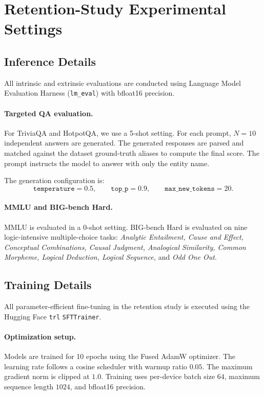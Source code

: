 \documentclass{article}
\begin{document}
\section{Retention-Study Experimental Settings}
\label{app:retention_study_settings}

\subsection{Inference Details}
\label{app:retention_inference_details}

All intrinsic and extrinsic evaluations are conducted using Language Model
Evaluation Harness (\texttt{lm\_eval}) with bfloat16 precision.

\paragraph{Targeted QA evaluation.}
For TriviaQA and HotpotQA, we use a 5-shot setting. For each prompt, \(N=10\)
independent answers are generated. The generated responses are parsed and
matched against the dataset ground-truth aliases to compute the final score.
The prompt instructs the model to answer with only the entity name.

The generation configuration is:
\[
\texttt{temperature}=0.5,
\qquad
\texttt{top\_p}=0.9,
\qquad
\texttt{max\_new\_tokens}=20.
\]

\paragraph{MMLU and BIG-bench Hard.}
MMLU is evaluated in a 0-shot setting. BIG-bench Hard is evaluated on nine
logic-intensive multiple-choice tasks:
\textit{Analytic Entailment, Cause and Effect, Conceptual Combinations,
Causal Judgment, Analogical Similarity, Common Morpheme, Logical Deduction,
Logical Sequence,} and \textit{Odd One Out}.

\subsection{Training Details}
\label{app:retention_training_details}

All parameter-efficient fine-tuning in the retention study is executed using
the Hugging Face \texttt{trl} \texttt{SFTTrainer}.

\paragraph{Optimization setup.}
Models are trained for 10 epochs using the Fused AdamW optimizer. The learning
rate follows a cosine scheduler with warmup ratio \(0.05\). The maximum
gradient norm is clipped at \(1.0\). Training uses per-device batch size \(64\),
maximum sequence length \(1024\), and bfloat16 precision.
\end{document}
